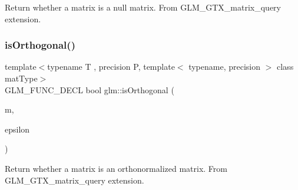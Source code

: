 Return whether a matrix is a null matrix. From G\+L\+M\+\_\+\+G\+T\+X\+\_\+matrix\+\_\+query extension. \mbox{\label{group__gtx__matrix__query_gab2cb5d23df77b4e4e63ad2965acd31b3}} 
\subsubsection{\texorpdfstring{is\+Orthogonal()}{isOrthogonal()}}
{\footnotesize\ttfamily template$<$typename T , precision P, template$<$ typename, precision $>$ class mat\+Type$>$ \\
G\+L\+M\+\_\+\+F\+U\+N\+C\+\_\+\+D\+E\+CL bool glm\+::is\+Orthogonal (\begin{DoxyParamCaption}\item[{mat\+Type$<$ T, P $>$ const \&}]{m,  }\item[{T const \&}]{epsilon }\end{DoxyParamCaption})}

Return whether a matrix is an orthonormalized matrix. From G\+L\+M\+\_\+\+G\+T\+X\+\_\+matrix\+\_\+query extension. 